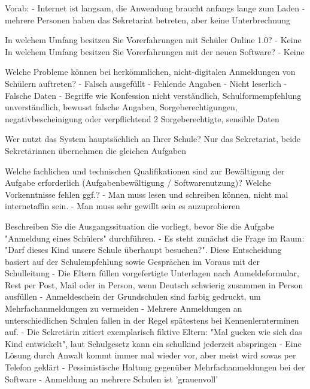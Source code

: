Vorab: 	
- Internet ist langsam, die Anwendung braucht anfangs lange zum Laden
- mehrere Personen haben das Sekretariat betreten, aber keine Unterbrechnung
 
In welchem Umfang besitzen Sie Vorerfahrungen mit Schüler Online 1.0? 	
- Keine				
In welchem Umfang besitzen Sie Vorerfahrungen mit der neuen Software?	
- Keine







Welche Probleme können bei herkömmlichen, nicht-digitalen Anmeldungen von Schülern auftreten?
- Falsch ausgefüllt
- Fehlende Angaben
- Nicht leserlich
- Falsche Daten
- Begriffe wie Konfession nicht verständlich, Schulformempfehlung unverständlich, bewusst falsche Angaben, Sorgeberechtigungen, negativbescheinigung oder verpflichtend 2 Sorgeberechtigte, sensible Daten




Wer nutzt das System hauptsächlich an Ihrer Schule?
Nur das Sekretariat, beide Sekretärinnen übernehmen die gleichen Aufgaben










Welche fachlichen und technischen Qualifikationen sind zur Bewältigung der Aufgabe erforderlich (Aufgabenbewältigung / Softwarenutzung)? Welche Vorkenntnisse fehlen ggf.?	
- Man muss lesen und schreiben können, nicht mal internetaffin sein.
- Man muss sehr gewillt sein es auzuprobieren		










Beschreiben Sie die Ausgangssituation die vorliegt, bevor Sie die Aufgabe "Anmeldung eines Schülers" durchführen.	
- Es steht zunächst die Frage im Raum: "Darf dieses Kind unsere Schule überhaupt besuchen?". Diese Entscheidung basiert auf der Schulempfehlung sowie Gesprächen im Voraus mit der Schulleitung
- Die Eltern füllen vorgefertigte Unterlagen nach Anmeldeformular, Rest per Post, Mail oder in Person, wenn Deutsch schwierig zusammen in Person ausfüllen	
- Anmeldeschein der Grundschulen sind farbig gedruckt, um Mehrfachanmeldungen zu vermeiden
- Mehrere Anmeldungen an unterschiedlichen Schulen fallen in der Regel spätestens bei Kennenlernterminen auf. 
 - Die Sekretärin zitiert exemplarisch fiktive Eltern: "Mal gucken wie sich das Kind entwickelt", laut Schulgesetz kann ein schulkind jederzeit abspringen	
- Eine Lösung durch Anwalt kommt immer mal wieder vor, aber meist wird sowas per Telefon geklärt
- Pessimistische Haltung gegenüber Mehrfachanmeldungen bei der Software
- Anmeldung an mehrere Schulen ist 'grauenvoll'



